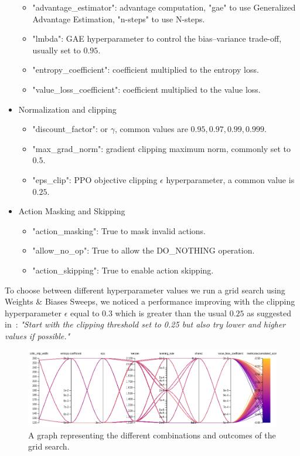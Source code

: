 \documentclass[11pt, a4paper, hidelinks]{report}
\begin{document}
\begin{itemize}
	\begin{itemize}
		\item "advantage\_estimator": advantage computation, "gae" to use Generalized Advantage Estimation, "n-steps" to use N-steps.
		\item "lmbda": GAE hyperparameter to control the bias–variance trade-off, usually set to $0.95$.
		\item "entropy\_coefficient": coefficient multiplied to the entropy loss.
		\item "value\_loss\_coefficient": coefficient multiplied to the value loss.
	\end{itemize}
	\item Normalization and clipping
	\begin{itemize}
		\item "discount\_factor": or $\gamma$, common values are $0.95, 0.97, 0.99, 0.999$.
		\item "max\_grad\_norm": gradient clipping maximum norm, commonly set to $0.5$.
		\item "eps\_clip": PPO objective clipping $\epsilon$ hyperparameter, a common value is $0.25$.
	\end{itemize}
	\item Action Masking and Skipping
	\begin{itemize}
		\item "action\_masking": True to mask invalid actions.
		\item "allow\_no\_op": True to allow the DO\_NOTHING operation.
		\item "action\_skipping": True to enable action skipping.
	\end{itemize}
\end{itemize}


To choose between different hyperparameter values we run a grid search using Weights \& Biases Sweeps, we noticed a performance improving with the clipping hyperparameter $\epsilon$ equal to $0.3$ which is greater than the usual $0.25$ as suggested in~\citep{ppo-implementation-2}: \textit{"Start with the clipping threshold set to 0.25 but also try lower and higher values if possible."}

\begin{figure}
\centering
\includegraphics[width=1.0\textwidth]{resources/psppo_sweep.png}
\caption{A graph representing the different combinations and outcomes of the grid search.}
\label{fig:psppo_sweep}
\end{figure}
\end{document}
